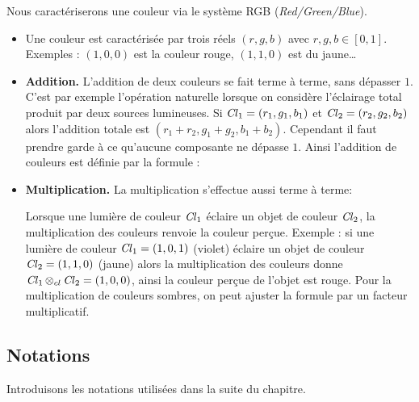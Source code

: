 \documentclass[11pt,class=report,crop=false]{standalone}
\begin{document}
Nous caractériserons une couleur via le système RGB (\emph{Red/Green/Blue}).
\begin{itemize}
  \item Une couleur est caractérisée par trois réels $(r,g,b)$ avec $r,g,b \in [0,1]$.
  Exemples : $(1,0,0)$ est la couleur rouge, $(1,1,0)$ est du jaune\ldots

  \item \textbf{Addition.} 
  L'addition de deux couleurs se fait terme à terme, sans dépasser $1$.
  C'est par exemple l'opération naturelle lorsque on considère l'éclairage total produit par deux sources lumineuses.
  Si $\operatorname{\it Cl}_1 = (r_1,g_1,b_1)$ et $\operatorname{\it Cl}_2 = (r_2,g_2,b_2)$ alors l'addition totale est $(r_1+r_2,g_1+g_2,b_1+b_2)$. Cependant il faut prendre garde à ce qu'aucune composante ne dépasse $1$. Ainsi l'addition de couleurs est définie par la formule :
  
  \smallskip


  \item \textbf{Multiplication.}
  La multiplication s'effectue aussi terme à terme:
  
  \smallskip
  

  Lorsque une lumière de couleur $\operatorname{\it Cl}_1$ éclaire un objet de couleur $\operatorname{\it Cl}_2$, la multiplication des couleurs renvoie la couleur perçue.
  Exemple : si une lumière de couleur $\operatorname{\it Cl}_1 = (1,0,1)$ (violet) éclaire un objet de couleur $\operatorname{\it Cl}_2 = (1,1,0)$ (jaune) alors la multiplication des couleurs donne  
  $\operatorname{\it Cl}_1 \otimes_{cl} \operatorname{\it Cl}_2 = (1,0,0)$, ainsi la couleur perçue de l'objet est rouge.
  Pour la multiplication de couleurs sombres, on peut ajuster la formule par un facteur multiplicatif.
  
\end{itemize}


\subsection{Notations}

Introduisons les notations utilisées dans la suite du chapitre.



\end{document}
